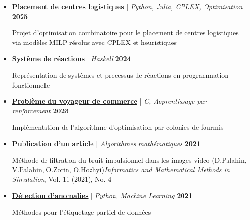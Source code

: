 \documentclass[10pt,english,french]{article}
\begin{document}
\vspace{-4pt}
\begin{itemize}[leftmargin=0.5cm, label=\textbullet, itemsep=0.2em]
    \item \href{https://github.com/DmytroPalahin/logistics-center-placement}{\textbf{Placement de centres logistiques}} | \textit{Python, Julia, CPLEX, Optimisation} \hfill \textbf{2025}

          Projet d’optimisation combinatoire pour le placement de centres logistiques via
          modèles MILP résolus avec CPLEX et heuristiques

    \item \href{https://github.com/DmytroPalahin/hsReact}{\textbf{Système de réactions}} | \textit{Haskell} \hfill \textbf{2024}

          Représentation de systèmes et processus de réactions en programmation
          fonctionnelle

    \item \href{https://github.com/DmytroPalahin/Probleme_du_Voyageur_de_Commerce}{\textbf{Problème du voyageur de commerce}} | \textit{C, Apprentissage par renforcement} \hfill \textbf{2023}

          Implémentation de l'algorithme d'optimisation par colonies de fourmis

    \item \href{https://www.researchsquare.com/article/rs-2203260/v1}{\textbf{Publication d'un article}} | \textit{Algorithmes mathématiques} \hfill \textbf{2021}

          Méthode de filtration du bruit impulsionnel dans les images vidéo (D.Palahin,
          V.Palahin, O.Zorin, O.Hozhyi)\newline\textit{Informatics and Mathematical
              Methods in Simulation}, Vol. 11 (2021), No. 4

    \item \href{https://github.com/DmytroPalahin/Anomaly_Detection}{\textbf{Détection d'anomalies}} | \textit{Python, Machine Learning} \hfill \textbf{2021}

          Méthodes pour l'étiquetage partiel de données


\end{itemize}
\end{document}
